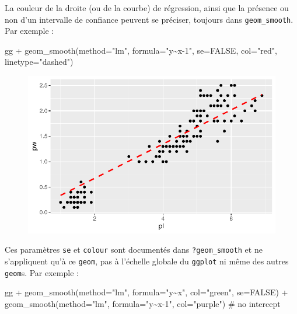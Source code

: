 \documentclass[
  letterpaper,
  DIV=11,
  numbers=noendperiod]{scrreprt}
\newenvironment{Shaded}{\begin{snugshade}}{\end{snugshade}}
\newcommand{\AttributeTok}[1]{\textcolor[rgb]{0.40,0.45,0.13}{#1}}
\newcommand{\CommentTok}[1]{\textcolor[rgb]{0.37,0.37,0.37}{#1}}
\newcommand{\ConstantTok}[1]{\textcolor[rgb]{0.56,0.35,0.01}{#1}}
\newcommand{\FunctionTok}[1]{\textcolor[rgb]{0.28,0.35,0.67}{#1}}
\newcommand{\NormalTok}[1]{\textcolor[rgb]{0.00,0.23,0.31}{#1}}
\newcommand{\SpecialCharTok}[1]{\textcolor[rgb]{0.37,0.37,0.37}{#1}}
\newcommand{\StringTok}[1]{\textcolor[rgb]{0.13,0.47,0.30}{#1}}
\begin{document}
La couleur de la droite (ou de la courbe) de régression, ainsi que la
présence ou non d'un intervalle de confiance peuvent se préciser,
toujours dans \texttt{geom\_smooth}. Par exemple :

\begin{Shaded}
\begin{Highlighting}[]
\NormalTok{gg }\SpecialCharTok{+} \FunctionTok{geom\_smooth}\NormalTok{(}\AttributeTok{method=}\StringTok{"lm"}\NormalTok{, }\AttributeTok{formula=}\StringTok{"y\textasciitilde{}x{-}1"}\NormalTok{, }\AttributeTok{se=}\ConstantTok{FALSE}\NormalTok{, }\AttributeTok{col=}\StringTok{"red"}\NormalTok{, }\AttributeTok{linetype=}\StringTok{"dashed"}\NormalTok{)}
\end{Highlighting}
\end{Shaded}

\begin{figure}[H]

{\centering \includegraphics{ggplot2_files/figure-pdf/unnamed-chunk-11-1.pdf}

}

\end{figure}

Ces paramètres \texttt{se} et \texttt{colour} sont documentés dans
\texttt{?geom\_smooth} et ne s'appliquent qu'à ce \texttt{geom}, pas à
l'échelle globale du \texttt{ggplot} ni même des autres \texttt{geom}s.
Par exemple :

\begin{Shaded}
\begin{Highlighting}[]
\NormalTok{gg }\SpecialCharTok{+} 
  \FunctionTok{geom\_smooth}\NormalTok{(}\AttributeTok{method=}\StringTok{"lm"}\NormalTok{, }\AttributeTok{formula=}\StringTok{"y\textasciitilde{}x"}\NormalTok{, }\AttributeTok{col=}\StringTok{"green"}\NormalTok{, }\AttributeTok{se=}\ConstantTok{FALSE}\NormalTok{) }\SpecialCharTok{+}
  \FunctionTok{geom\_smooth}\NormalTok{(}\AttributeTok{method=}\StringTok{"lm"}\NormalTok{, }\AttributeTok{formula=}\StringTok{"y\textasciitilde{}x{-}1"}\NormalTok{, }\AttributeTok{col=}\StringTok{"purple"}\NormalTok{) }\CommentTok{\# no intercept}
\end{Highlighting}
\end{Shaded}
\end{document}
